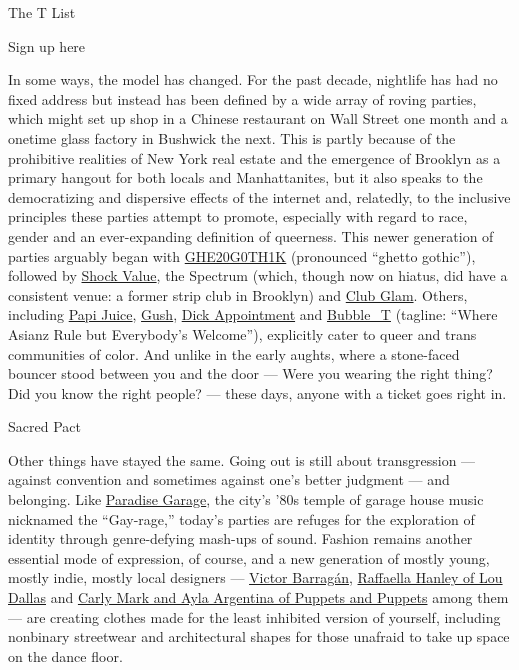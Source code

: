 The T List \textbar{}

Sign up here

In some ways, the model has changed. For the past decade, nightlife has
had no fixed address but instead has been defined by a wide array of
roving parties, which might set up shop in a Chinese restaurant on Wall
Street one month and a onetime glass factory in Bushwick the next. This
is partly because of the prohibitive realities of New York real estate
and the emergence of Brooklyn as a primary hangout for both locals and
Manhattanites, but it also speaks to the democratizing and dispersive
effects of the internet and, relatedly, to the inclusive principles
these parties attempt to promote, especially with regard to race, gender
and an ever-expanding definition of queerness. This newer generation of
parties arguably began with
\href{https://www.instagram.com/ghe20g0th1k/?hl=en}{GHE20G0TH1K}
(pronounced ``ghetto gothic''), followed by
\href{https://www.facebook.com/SHOCKVALUENYC/}{Shock Value}, the
Spectrum (which, though now on hiatus, did have a consistent venue: a
former strip club in Brooklyn) and
\href{http://officemagazine.net/not-just-party-club-glam}{Club Glam}.
Others, including
\href{https://www.instagram.com/papijuicebk/?hl=en}{Papi Juice},
\href{https://www.instagram.com/gushofficial/?hl=en}{Gush},
\href{https://www.instagram.com/dickappointment__/?hl=en}{Dick
Appointment} and
\href{https://www.instagram.com/bubble____t/?hl=en}{Bubble\_T} (tagline:
``Where Asianz Rule but Everybody's Welcome''), explicitly cater to
queer and trans communities of color. And unlike in the early aughts,
where a stone-faced bouncer stood between you and the door --- Were you
wearing the right thing? Did you know the right people? --- these days,
anyone with a ticket goes right in.

Sacred Pact

Other things have stayed the same. Going out is still about
transgression --- against convention and sometimes against one's better
judgment --- and belonging. Like
\href{https://tmagazine.blogs.nytimes.com/2014/05/09/flashback-memories-of-the-paradise-garage-larry-levan-street-party/}{Paradise
Garage}, the city's '80s temple of garage house music nicknamed the
``Gay-rage,'' today's parties are refuges for the exploration of
identity through genre-defying mash-ups of sound. Fashion remains
another essential mode of expression, of course, and a new generation of
mostly young, mostly indie, mostly local designers ---
\href{http://www.barragannnn.com/collections}{Victor Barragán},
\href{https://www.nytimes.com/2018/09/12/t-magazine/lou-dallas-fashion-brand-raffaella-hanley.html}{Raffaella
Hanley of Lou Dallas} and
\href{https://www.nytimes.com/2019/09/06/t-magazine/new-fashion-designers-susan-fang-super-yaya.html}{Carly
Mark and Ayla Argentina of Puppets and Puppets} among them --- are
creating clothes made for the least inhibited version of yourself,
including nonbinary streetwear and architectural shapes for those
unafraid to take up space on the dance floor.

